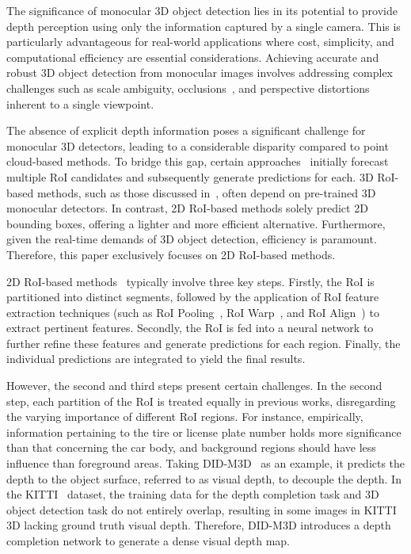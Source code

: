 \documentclass[journal]{IEEEtran}
\begin{document}
	The significance of monocular 3D object detection lies in its potential to provide depth perception using only the information captured by a single camera. This is particularly advantageous for real-world applications where cost, simplicity, and computational efficiency are essential considerations. Achieving accurate and robust 3D object detection from monocular images involves addressing complex challenges such as scale ambiguity, occlusions~\cite{tits shape aware}, and perspective distortions inherent to a single viewpoint.
	
	The absence of explicit depth information poses a significant challenge for monocular 3D detectors, leading to a considerable disparity compared to point cloud-based methods. To bridge this gap, certain approaches~\cite{gupnet, didm3d, neurocs} initially forecast multiple RoI candidates and subsequently generate predictions for each. 3D RoI-based methods, such as those discussed in~\cite{neurocs}, often depend on pre-trained 3D monocular detectors. In contrast, 2D RoI-based methods solely predict 2D bounding boxes, offering a lighter and more efficient alternative. Furthermore, given the real-time demands of 3D object detection, efficiency is paramount. Therefore, this paper exclusively focuses on 2D RoI-based methods.
	
	2D RoI-based methods~\cite{gupnet, didm3d} typically involve three key steps. Firstly, the RoI is partitioned into distinct segments, followed by the application of RoI feature extraction techniques (such as RoI Pooling~\cite{fast-rcnn}, RoI Warp~\cite{roi-warp}, and RoI Align~\cite{mask-rcnn}) to extract pertinent features. Secondly, the RoI is fed into a neural network to further refine these features and generate predictions for each region. Finally, the individual predictions are integrated to yield the final results.
	
	However, the second and third steps present certain challenges. In the second step, each partition of the RoI is treated equally in previous works, disregarding the varying importance of different RoI regions. For instance, empirically, information pertaining to the tire or license plate number holds more significance than that concerning the car body, and background regions should have less influence than foreground areas. Taking DID-M3D~\cite{didm3d} as an example, it predicts the depth to the object surface, referred to as visual depth, to decouple the depth. In the KITTI~\cite{kitti} dataset, the training data for the depth completion task and 3D object detection task do not entirely overlap, resulting in some images in KITTI 3D lacking ground truth visual depth. Therefore, DID-M3D introduces a depth completion network to generate a dense visual depth map. 
	
\end{document}
